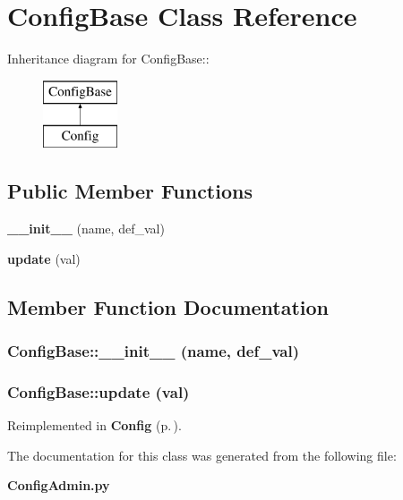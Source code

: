 \section{Config\-Base Class Reference}
\label{classConfigBase}
Inheritance diagram for Config\-Base::\begin{figure}[H]
\begin{center}
\leavevmode
\includegraphics[height=2cm]{classConfigBase}
\end{center}
\end{figure}
\subsection*{Public Member Functions}
\begin{CompactItemize}
\item 
{\bf \_\-\_\-init\_\-\_\-} (name, def\_\-val)
\item 
{\bf update} (val)
\end{CompactItemize}


\subsection{Member Function Documentation}
\subsubsection{\setlength{\rightskip}{0pt plus 5cm}Config\-Base::\_\-\_\-init\_\-\_\- (name, def\_\-val)}\label{classConfigBase_ConfigBasea0}


\subsubsection{\setlength{\rightskip}{0pt plus 5cm}Config\-Base::update (val)}\label{classConfigBase_ConfigBasea1}




Reimplemented in {\bf Config} {\rm (p.\,\pageref{classConfig_Configa1})}.

The documentation for this class was generated from the following file:\begin{CompactItemize}
\item 
{\bf Config\-Admin.py}\end{CompactItemize}
